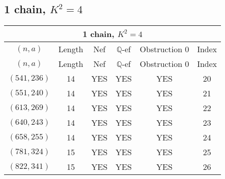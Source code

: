 \subsection{1 chain, $K^2 = 4$}
\begin{longtable}{|c|c|c|c|c|c|}
\hline
\multicolumn{6}{|c|}{1 chain, $K^2 = 4$}\\
\hline
$(n,a)$ & Length & Nef & $\mathbb Q$-ef & Obstruction 0 & Index\\
\hline
\endfirsthead

\hline
$(n,a)$ & Length & Nef & $\mathbb Q$-ef & Obstruction 0 & Index\\
\hline
\endhead
\hline
\endfoot

$(541, 236)$ & 14 & YES & YES & YES & 20\\
$(551, 240)$ & 14 & YES & YES & YES & 21\\
$(613, 269)$ & 14 & YES & YES & YES & 22\\
$(640, 243)$ & 14 & YES & YES & YES & 23\\
$(658, 255)$ & 14 & YES & YES & YES & 24\\
$(781, 324)$ & 15 & YES & YES & YES & 25\\
$(822, 341)$ & 15 & YES & YES & YES & 26
\end{longtable}
